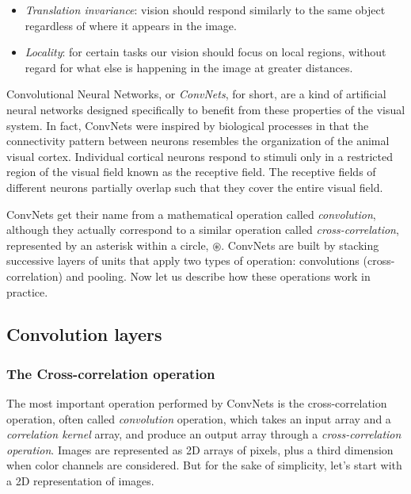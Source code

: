 \begin{itemize}
    \item \textit{Translation invariance}: vision should respond similarly to the same object regardless of where it appears in the image.
    \item \textit{Locality}: for certain tasks our vision should focus on local regions, without regard for what else is happening in the image at greater distances.
\end{itemize}

Convolutional Neural Networks, or \textit{ConvNets}, for short, are a kind of artificial neural networks designed specifically to benefit  from these properties of the visual system. In fact, ConvNets were inspired by biological processes in that the connectivity pattern between neurons resembles the organization of the animal visual cortex. Individual cortical neurons respond to stimuli only in a restricted region of the visual field known as the receptive field. The receptive fields of different neurons partially overlap such that they cover the entire visual field.

ConvNets get their name from a mathematical operation called \textit{convolution}, although they actually correspond to a similar operation called \textit{cross-correlation}, represented by an asterisk within a circle, $\circledast$. ConvNets are built by stacking successive layers of units that apply two types of operation: convolutions (cross-correlation) and pooling. Now let us describe how these operations work in practice.

\subsection{Convolution layers}\label{subsec:conv_layers}

\subsubsection{The Cross-correlation operation}

The most important operation performed by ConvNets is the cross-correlation operation, often called \textit{convolution} operation, which takes an input array and a \textit{correlation kernel} array, and produce an output array through a \textit{cross-correlation operation}. Images are represented as 2D arrays of pixels, plus a third dimension when color channels are considered. But for the sake of simplicity, let's start with a 2D representation of images. 

